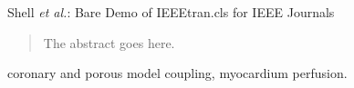 \documentclass[journal]{IEEEtran}
\begin{document}
%
{Shell \MakeLowercase{\textit{et al.}}: Bare Demo of IEEEtran.cls for IEEE Journals}
% 











\maketitle

\begin{abstract}
The abstract goes here.
\end{abstract}

\begin{IEEEkeywords}
coronary and porous model coupling, myocardium perfusion.
\end{IEEEkeywords}






%
\IEEEpeerreviewmaketitle
\end{document}
